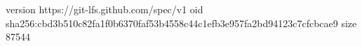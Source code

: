 version https://git-lfs.github.com/spec/v1
oid sha256:cbd3b510c82fa1f0b6370faf53b4558c44c1efb3e957fa2bd94123c7cfcbcae9
size 87544
